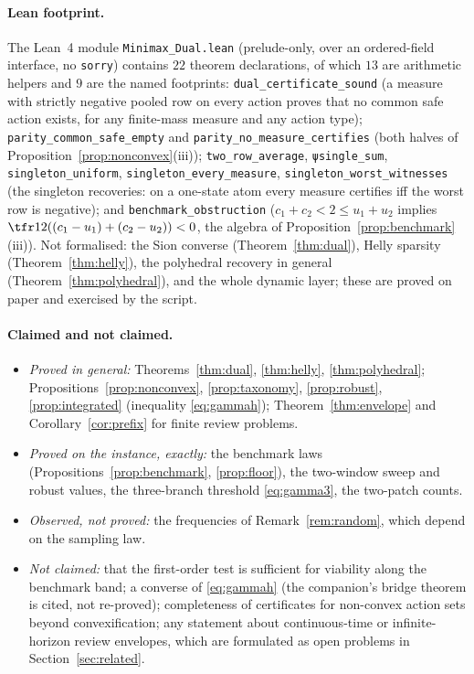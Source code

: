 \paragraph{Lean footprint.} The Lean~4 module \cite{deMoura2021} \texttt{Minimax\_Dual.lean} (prelude-only, over an ordered-field interface, no \texttt{sorry}) contains $22$ theorem declarations, of which $13$ are arithmetic helpers and $9$ are the named footprints: \texttt{dual\_certificate\_sound} (a measure with strictly negative pooled row on every action proves that no common safe action exists, for any finite-mass measure and any action type); \texttt{parity\_common\_safe\_empty} and \texttt{parity\_no\_measure\_certifies} (both halves of Proposition~\ref{prop:nonconvex}(iii)); \texttt{two\_row\_average}, \texttt{ψsingle\_sum}, \texttt{singleton\_uniform}, \texttt{singleton\_every\_measure}, \texttt{singleton\_worst\_witnesses} (the singleton recoveries: on a one-state atom every measure certifies iff the worst row is negative); and \texttt{benchmark\_obstruction} ($c_1+c_2<2\le u_1+u_2$ implies $\tfr12((c_1-u_1)+(c_2-u_2))<0$, the algebra of Proposition~\ref{prop:benchmark}(iii)). Not formalised: the Sion converse (Theorem~\ref{thm:dual}), Helly sparsity (Theorem~\ref{thm:helly}), the polyhedral recovery in general (Theorem~\ref{thm:polyhedral}), and the whole dynamic layer; these are proved on paper and exercised by the script.

\paragraph{Claimed and not claimed.}
\begin{itemize}[leftmargin=1.4em,itemsep=1pt]
\item \emph{Proved in general:} Theorems~\ref{thm:dual}, \ref{thm:helly}, \ref{thm:polyhedral}; Propositions~\ref{prop:nonconvex}, \ref{prop:taxonomy}, \ref{prop:robust}, \ref{prop:integrated} (inequality \eqref{eq:gammah}); Theorem~\ref{thm:envelope} and Corollary~\ref{cor:prefix} for finite review problems.
\item \emph{Proved on the instance, exactly:} the benchmark laws (Propositions~\ref{prop:benchmark}, \ref{prop:floor}), the two-window sweep and robust values, the three-branch threshold \eqref{eq:gamma3}, the two-patch counts.
\item \emph{Observed, not proved:} the frequencies of Remark~\ref{rem:random}, which depend on the sampling law.
\item \emph{Not claimed:} that the first-order test is sufficient for viability along the benchmark band; a converse of \eqref{eq:gammah} (the companion's bridge theorem is cited, not re-proved); completeness of certificates for non-convex action sets beyond convexification; any statement about continuous-time or infinite-horizon review envelopes, which are formulated as open problems in Section~\ref{sec:related}.
\end{itemize}
